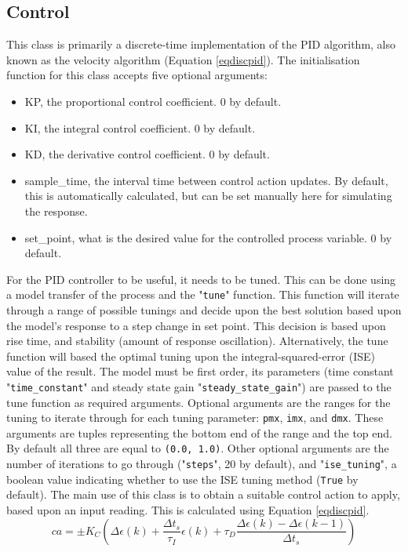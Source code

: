 \documentclass[twoside,a4]{report}
\def\br{\newline \newline \noindent}
\begin{document}
	\subsection*{Control} %
	This class is primarily a discrete-time implementation of the PID algorithm, also known as the velocity algorithm (Equation \ref{eqdiscpid}).\br
	The initialisation function for this class accepts five optional arguments:
	\begin{itemize}
		\item KP, the proportional control coefficient. 0 by default.
		\item KI, the integral control coefficient. 0 by default.
		\item KD, the derivative control coefficient. 0 by default.
		\item sample\_time, the interval time between control action updates. By default, this is automatically calculated, but can be set manually here for simulating the response.
		\item set\_point, what is the desired value for the controlled process variable. 0 by default.
	\end{itemize}
	For the PID controller to be useful, it needs to be tuned. This can be done using a model transfer of the process and the "\texttt{tune}" function. This function will iterate through a range of possible tunings and decide upon the best solution based upon the model's response to a step change in set point. This decision is based upon rise time, and stability (amount of response oscillation). Alternatively, the tune function will based the optimal tuning upon the integral-squared-error (ISE) value of the result. The model must be first order, its parameters (time constant "\texttt{time\_constant}" and steady state gain "\texttt{steady\_state\_gain}") are passed to the tune function as required arguments. Optional arguments are the ranges for the tuning to iterate through for each tuning parameter: \texttt{pmx}, \texttt{imx}, and \texttt{dmx}. These arguments are tuples representing the bottom end of the range and the top end. By default all three are equal to \texttt{(0.0, 1.0)}. Other optional arguments are the number of iterations to go through ("\texttt{steps}", 20 by default), and "\texttt{ise\_tuning}", a boolean value indicating whether to use the ISE tuning method (\texttt{True} by default). \br
	The main use of this class is to obtain a suitable control action to apply, based upon an input reading. This is calculated using Equation \ref{eqdiscpid}.
	\begin{equation}
	ca = \pm K_C \left(\Delta \epsilon (k) + \frac{\Delta t_s}{\tau _I}\epsilon (k) + \tau _D \frac{\Delta \epsilon(k) - \Delta \epsilon(k - 1)}{\Delta t_s}\right)
	\label{eqdiscpid}
	\end{equation}
\end{document}
